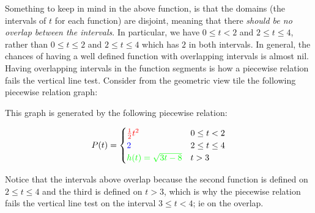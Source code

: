 \documentclass{ximera}
\begin{document}
Something to keep in mind in the above function, is that the domains (the intervals of $t$ for each function) are disjoint, meaning that there \textit{should be no overlap between the intervals}. In particular, we have $0 \leq t < 2$ and $2 \leq t \leq 4$, rather than $0 \leq t \leq 2$ and $2 \leq t \leq 4$ which has $2$ in both intervals. In general, the chances of having a well defined function with overlapping intervals is almost nil. Having overlapping intervals in the function segments is how a piecewise relation fails the vertical line test. Consider from the geometric view tile the following piecewise relation graph:

\begin{center}
\end{center}

This graph is generated by the following piecewise relation:


\[
    P(t) =
        \begin{cases}
            {\color{red}\frac{1}{2}t^2} & 0\leq t < 2 \\
            {\color{blue} 2} & 2 \leq t \leq 4 \\
            {\color{green} h(t) = \sqrt{3t-8}} & t > 3
        \end{cases}
\]

Notice that the intervals above overlap because the second function is defined on $2 \leq t \leq 4$ and the third is defined on $t > 3$, which is why the piecewise relation fails the vertical line test on the interval $3 \leq t < 4$; ie on the overlap.
\end{document}
